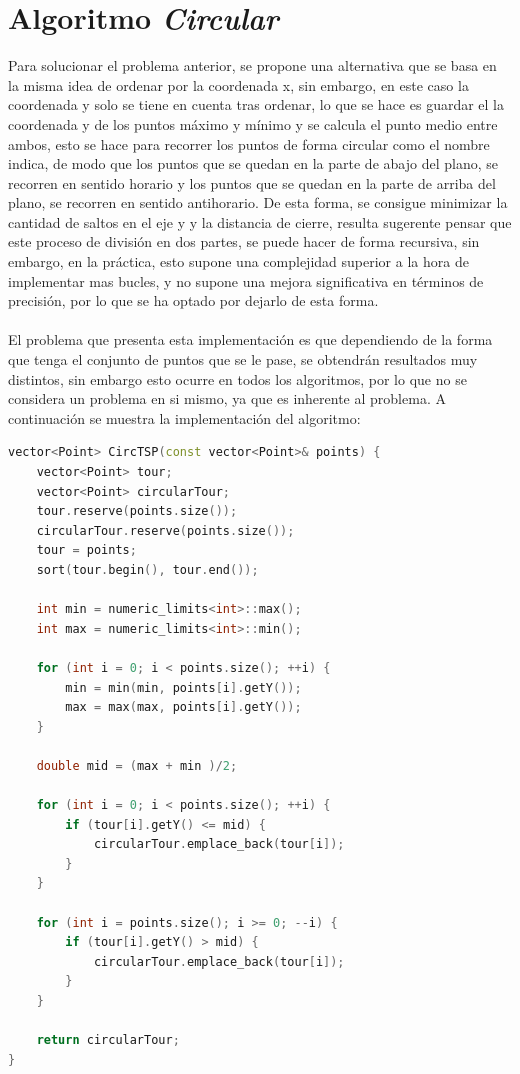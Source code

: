 \documentclass[11pt,openany]{book}
\begin{document}
\section{Algoritmo \textit{Circular}}
Para solucionar el problema anterior, se propone una alternativa que se basa en la misma
idea de ordenar por la coordenada x, sin embargo, en este caso la coordenada y solo se tiene 
en cuenta tras ordenar, lo que se hace es guardar el la coordenada y de los puntos máximo
y mínimo y se calcula el punto medio entre ambos, esto se hace para recorrer los puntos
de forma circular como el nombre indica, de modo que los puntos que se quedan en la parte 
de abajo del plano, se recorren en sentido horario y los puntos que se quedan en la parte
de arriba del plano, se recorren en sentido antihorario. De esta forma, se consigue minimizar
la cantidad de saltos en el eje y y la distancia de cierre, resulta sugerente pensar que este 
proceso de división en dos partes, se puede hacer de forma recursiva, sin embargo, en la 
práctica, esto supone una complejidad superior a la hora de implementar mas bucles, y no
supone una mejora significativa en términos de precisión, por lo que se ha optado por
dejarlo de esta forma. 
\\ \\
El problema que presenta esta implementación es que dependiendo de la forma que tenga
el conjunto de puntos que se le pase, se obtendrán resultados muy distintos, sin embargo
esto ocurre en todos los algoritmos, por lo que no se considera un problema en si mismo, 
ya que es inherente al problema. A continuación se muestra la implementación del algoritmo:
\begin{lstlisting}[language=C++]
vector<Point> CircTSP(const vector<Point>& points) {
    vector<Point> tour;
    vector<Point> circularTour;
    tour.reserve(points.size());
    circularTour.reserve(points.size());
    tour = points;
    sort(tour.begin(), tour.end());
    
    int min = numeric_limits<int>::max();
    int max = numeric_limits<int>::min();

    for (int i = 0; i < points.size(); ++i) {
        min = min(min, points[i].getY());
        max = max(max, points[i].getY());
    }
    
    double mid = (max + min )/2;

    for (int i = 0; i < points.size(); ++i) {
        if (tour[i].getY() <= mid) {
            circularTour.emplace_back(tour[i]);
        }
    }

    for (int i = points.size(); i >= 0; --i) {
        if (tour[i].getY() > mid) {
            circularTour.emplace_back(tour[i]);
        }
    }

    return circularTour;
}
\end{lstlisting}
\end{document}
